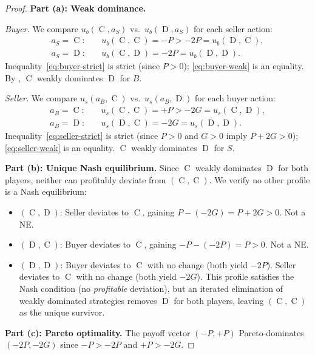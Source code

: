 \documentclass[11pt,a4paper]{article}
\theoremstyle{definition}
\theoremstyle{remark}
\newcommand{\pay}{P}           %
\newcommand{\cumval}{G}        %
\newcommand{\ub}{u_b}          %
\newcommand{\us}{u_s}          %
\DeclareMathOperator{\Coop}{C}
\DeclareMathOperator{\Def}{D}
\begin{document}
\begin{proof}
\textbf{Part (a): Weak dominance.}

\emph{Buyer.} We compare $\ub(\Coop, a_S)$ vs.\
$\ub(\Def, a_S)$ for each seller action:
\begin{align}
  a_S = \Coop: &\quad \ub(\Coop, \Coop) = -\pay > -2\pay = \ub(\Def, \Coop),
    \label{eq:buyer-strict} \\
  a_S = \Def: &\quad \ub(\Coop, \Def) = -2\pay = \ub(\Def, \Def).
    \label{eq:buyer-weak}
\end{align}
Inequality~\eqref{eq:buyer-strict} is strict (since $\pay > 0$);
\eqref{eq:buyer-weak} is an equality. By \Cref{def:dominance}, $\Coop$
weakly dominates $\Def$ for $B$.

\emph{Seller.} We compare $\us(a_B, \Coop)$ vs.\
$\us(a_B, \Def)$ for each buyer action:
\begin{align}
  a_B = \Coop: &\quad \us(\Coop, \Coop) = +\pay > -2\cumval = \us(\Coop, \Def),
    \label{eq:seller-strict} \\
  a_B = \Def: &\quad \us(\Def, \Coop) = -2\cumval = \us(\Def, \Def).
    \label{eq:seller-weak}
\end{align}
Inequality~\eqref{eq:seller-strict} is strict (since $\pay > 0$ and
$\cumval > 0$ imply $\pay + 2\cumval > 0$);
\eqref{eq:seller-weak} is an equality. $\Coop$ weakly dominates $\Def$
for $S$.

\textbf{Part (b): Unique Nash equilibrium.}
Since $\Coop$ weakly dominates $\Def$ for both players, neither can
profitably deviate from $(\Coop, \Coop)$. We verify no other profile
is a Nash equilibrium:
\begin{itemize}
  \item $(\Coop, \Def)$: Seller deviates to $\Coop$, gaining
    $\pay - (-2\cumval) = \pay + 2\cumval > 0$. Not a NE.
  \item $(\Def, \Coop)$: Buyer deviates to $\Coop$, gaining
    $-\pay - (-2\pay) = \pay > 0$. Not a NE.
  \item $(\Def, \Def)$: Buyer deviates to $\Coop$ with no change
    (both yield $-2\pay$). Seller deviates to $\Coop$ with no change
    (both yield $-2\cumval$). This profile satisfies the Nash
    condition (no \emph{profitable} deviation), but an iterated
    elimination of weakly dominated strategies removes $\Def$ for
    both players, leaving $(\Coop, \Coop)$ as the unique survivor.
\end{itemize}

\textbf{Part (c): Pareto optimality.}
The payoff vector $(-\pay, +\pay)$ Pareto-dominates $(-2\pay, -2\cumval)$
since $-\pay > -2\pay$ and $+\pay > -2\cumval$.
\end{proof}
\end{document}

